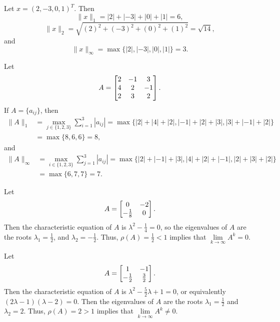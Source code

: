 \documentclass[newpage]{homework}
\begin{document}
	\maketitle
	
	\question 
	\begin{alphaparts}
		\questionpart Let $x = (2,-3,0,1)^T$. Then
		\begin{equation*}
			\lVert x \rVert_1 = |2| + |-3| + |0| + |1| = 6,
		\end{equation*}
		\begin{equation*}
			\lVert x\rVert_2 = \sqrt{(2)^2 + (-3)^2 + (0)^2 + (1)^2} = \sqrt{14},
		\end{equation*}
		and
		\begin{equation*}
			\lVert x \rVert_\infty = \max\{|2|, |-3|, |0|, |1|\} = 3.
		\end{equation*}
		
		\questionpart Let
		\begin{equation*}
			A = \left[\begin{matrix}
				2 & -1 & 3 \\
				4 & 2 & -1 \\
				2 & 3 & 2
			\end{matrix}\right].
		\end{equation*}
		If $A = \{a_{ij}\}$, then
		\begin{align*}
			\lVert A \rVert_1 &= \max_{j\in\{1,2,3\}}\sum_{i=1}^3 |a_{ij}| = \max\{|2|+|4|+|2|, |-1|+|2|+|3|, |3|+|-1|+|2|\} \\
			&= \max\{8, 6, 6\} = 8,
		\end{align*}
		and
		\begin{align*}
			\lVert A \rVert_\infty &=\max_{i\in\{1,2,3\}}\sum_{j=1}^3 |a_{ij}| = \max\{|2|+|-1| + |3|, |4|+|2| + |-1|, |2|+|3|+|2|\} \\
		&= \max\{6, 7, 7\} = 7.
		\end{align*}
	\end{alphaparts}
	
	\question 
	\begin{alphaparts}
		\questionpart Let
		\begin{equation*}
			A = \left[\begin{matrix}0 & -2 \\ -\frac{1}{8} & 0\end{matrix}\right].
		\end{equation*}
		Then the characteristic equation of $A$ is $\lambda^2 - \frac{1}{4} = 0$, so the eigenvalues of $A$ are the roots $\lambda_1 = \frac{1}{2}$, and $\lambda_2 = -\frac{1}{2}$. Thus, $\rho(A) = \frac{1}{2} < 1$ implies that $\lim\limits_{k\to\infty} A^k = 0$.
		
		\questionpart Let
		\begin{equation*}
			A = \left[\begin{matrix}1 & -1 \\ -\frac{1}{2} & \frac{3}{2}\end{matrix}\right].
		\end{equation*}
		Then the characteristic equation of $A$ is $\lambda^2 - \frac{5}{2}\lambda + 1 = 0$, or equivalently $(2\lambda - 1)(\lambda - 2) = 0$. Then the eigenvalues of $A$ are the roots $\lambda_1 = \frac{1}{2}$ and $\lambda_2 = 2$. Thus, $\rho(A) = 2 > 1$ implies that $\lim\limits_{k\to \infty} A^k \ne 0$.
	\end{alphaparts}
	
\end{document}
